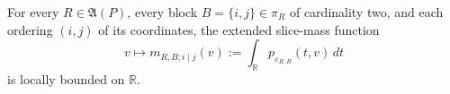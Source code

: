 For every \(R\in\mathfrak A(P)\), every block \(B=\{i,j\}\in\pi_R\) of cardinality two, and each ordering \((i,j)\) of its coordinates, the extended slice-mass function
\[
 v\longmapsto m_{R,B;i\mid j}(v)
 :=\int_{\mathbb R}p_{\varepsilon_{R,B}}(t,v)\,dt
\]
is locally bounded on \(\mathbb R\).